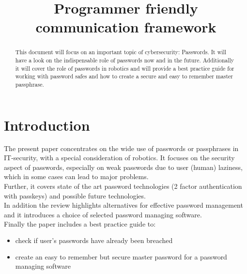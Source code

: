 \documentclass[conference]{IEEEtran}
\begin{document}
\title{Programmer friendly communication framework}

\author{
    \and
}

\maketitle

\begin{abstract}
This document will focus on an important topic of cybersecurity: Passwords. It will have a look on the indispensable role of passwords now and in the future. Additionally it will cover the role of passwords in robotics and will provide a best practice guide for working with password safes and how to create a secure and easy to remember master passphrase.
\end{abstract}

\section{Introduction}
The present paper concentrates on the wide use of passwords or passphrases in IT-security, with a special consideration of robotics. It focuses on the security aspect of passwords, especially on weak passwords due to user (human) laziness, which in some cases can lead to major problems. \\
Further, it covers state of the art password technologies (2 factor authentication with passkeys) and possible future technologies.\\
In addition the review highlights alternatives for effective password management and it introduces a choice of selected password managing software. \\
Finally the paper includes a best practice guide to:
\begin{itemize}
\item check if user's passwords have already been breached 
\item create an easy to remember but secure master password for a password managing software
\end{itemize} 
\end{document}
